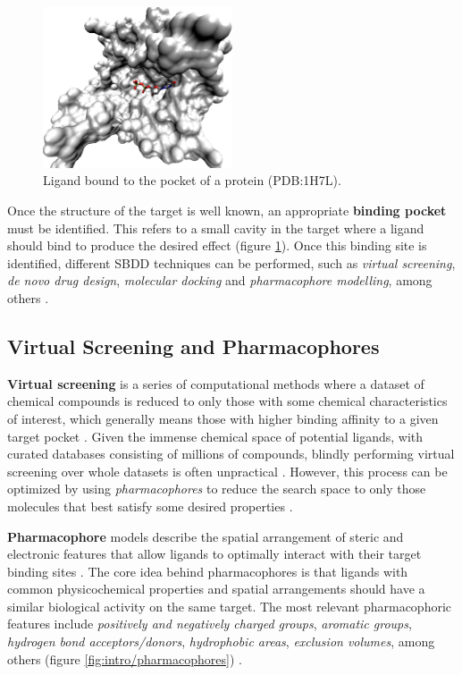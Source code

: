     \begin{figure}[H]
      \centering
      \includegraphics[width=0.5\textwidth]{figures/intro/pocket.png}
      \caption{\label{fig:intro/pocket} Ligand bound to the pocket of a protein (PDB:1H7L).}
    \end{figure}

    Once the structure of the target is well known, an appropriate \textbf{binding pocket} must be identified. This refers to a small cavity in the target where a ligand should bind to produce the desired effect (figure \ref{fig:intro/pocket}). Once this binding site is identified, different SBDD techniques can be performed, such as \textit{virtual screening}, \textit{de novo drug design}, \textit{molecular docking} and \textit{pharmacophore modelling}, among others \cite{drug_discovery_2014, structure_based_2019, pharmacophore_and_VS_2022}.

  \subsection{Virtual Screening and Pharmacophores}
    \textbf{Virtual screening} is a series of computational methods where a dataset of chemical compounds is reduced to only those with some chemical characteristics of interest, which generally means those with higher binding affinity to a given target pocket \cite{pharmacophore_and_VS_2022, virtual_screening_2019}. Given the immense chemical space of potential ligands, with curated databases consisting of millions of compounds, blindly performing virtual screening over whole datasets is often unpractical \cite{virtual_screening_2013}. However, this process can be optimized by using \textit{pharmacophores} to reduce the search space to only those molecules that best satisfy some desired properties \cite{pharmacophore_and_VS_2022}.

    \textbf{Pharmacophore} models describe the spatial arrangement of steric and electronic features that allow ligands to optimally interact with their target binding sites \cite{pharmacophore_and_VS_2022, virtual_screening_2019, pharmacophore_modelling_2022, drug_discovery_2014}. The core idea behind pharmacophores is that ligands with common physicochemical properties and spatial arrangements should have a similar biological activity on the same target. The most relevant pharmacophoric features include \textit{positively and negatively charged groups}, \textit{aromatic groups}, \textit{hydrogen bond acceptors/donors}, \textit{hydrophobic areas}, \textit{exclusion volumes}, among others (figure \ref{fig:intro/pharmacophores}) \cite{pharmacophore_and_VS_2022, drug_discovery_2014}.

